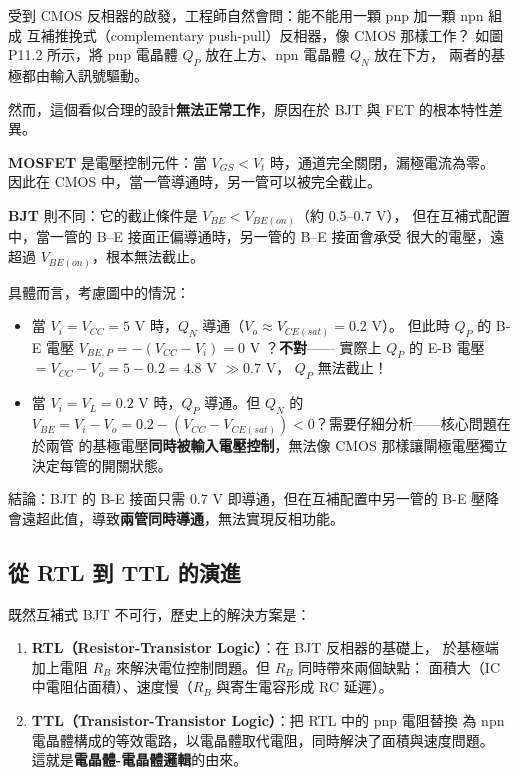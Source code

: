 \documentclass[12pt]{article}
\begin{document}
\begin{minipage}{0.60\linewidth}
受到 CMOS 反相器的啟發，工程師自然會問：能不能用一顆 pnp 加一顆 npn 組成
互補推挽式（complementary push-pull）反相器，像 CMOS 那樣工作？
如圖 P11.2 所示，將 pnp 電晶體 $Q_P$ 放在上方、npn 電晶體 $Q_N$ 放在下方，
兩者的基極都由輸入訊號驅動。

然而，這個看似合理的設計\textbf{無法正常工作}，原因在於 BJT 與 FET 的根本特性差異。
\end{minipage}\hfill
\begin{minipage}{0.37\linewidth}
\end{minipage}

\begin{keybox}
\textbf{MOSFET} 是電壓控制元件：當 $V_{GS} < V_t$ 時，通道完全關閉，漏極電流為零。
因此在 CMOS 中，當一管導通時，另一管可以被完全截止。

\textbf{BJT} 則不同：它的截止條件是 $V_{BE} < V_{BE(on)}$（約 0.5--0.7 V），
但在互補式配置中，當一管的 B--E 接面正偏導通時，另一管的 B--E 接面會承受
很大的電壓，遠超過 $V_{BE(on)}$，根本無法截止。

具體而言，考慮圖中的情況：
\begin{itemize}[leftmargin=2em,itemsep=2pt]
\item 當 $V_i = V_{CC} = 5$ V 時，$Q_N$ 導通（$V_o \approx V_{CE(sat)} = 0.2$ V）。
  但此時 $Q_P$ 的 B-E 電壓 $V_{BE,P} = -(V_{CC} - V_i) = 0$ V ？\textbf{不對}——
  實際上 $Q_P$ 的 E-B 電壓 $= V_{CC} - V_o = 5 - 0.2 = 4.8$ V $\gg 0.7$ V，
  $Q_P$ 無法截止！
\item 當 $V_i = V_L = 0.2$ V 時，$Q_P$ 導通。但 $Q_N$ 的 $V_{BE} = V_i - V_o
  = 0.2 - (V_{CC} - V_{CE(sat)}) < 0$？需要仔細分析——核心問題在於兩管
  的基極電壓\textbf{同時被輸入電壓控制}，無法像 CMOS 那樣讓閘極電壓獨立
  決定每管的開關狀態。
\end{itemize}
結論：BJT 的 B-E 接面只需 0.7 V 即導通，但在互補配置中另一管的 B-E 壓降
會遠超此值，導致\textbf{兩管同時導通}，無法實現反相功能。
\end{keybox}

\subsection*{從 RTL 到 TTL 的演進}

既然互補式 BJT 不可行，歷史上的解決方案是：

\begin{enumerate}[leftmargin=2.4em,itemsep=2pt]
\item \textbf{RTL（Resistor-Transistor Logic）}：在 BJT 反相器的基礎上，
  於基極端加上電阻 $R_B$ 來解決電位控制問題。但 $R_B$ 同時帶來兩個缺點：
  面積大（IC 中電阻佔面積）、速度慢（$R_B$ 與寄生電容形成 RC 延遲）。
\item \textbf{TTL（Transistor-Transistor Logic）}：把 RTL 中的 pnp 電阻替換
  為 npn 電晶體構成的等效電路，以電晶體取代電阻，同時解決了面積與速度問題。
  這就是\textbf{電晶體-電晶體邏輯}的由來。
\end{enumerate}
\end{document}
